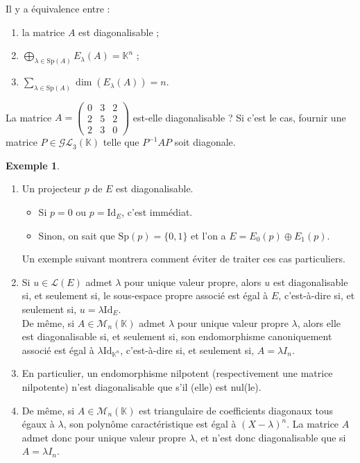 \documentclass[french]{article}
\newcommand{\K}{\mathbb{K}}
\newcommand{\inv}{^{-1}}
\newcommand{\Id}{\text{Id}}
\newcommand{\Sp}{\text{Sp}}
\theoremstyle{plain}
\theoremstyle{definition}
\newtheorem*{ex}{Exemple}
\theoremstyle{remark}
\begin{document}
	\begin{cor}%
		Il y a équivalence entre :
		\begin{enumerate}[label=(\roman*)]
			\item la matrice $A$ est diagonalisable ;
			\item $\displaystyle\bigoplus_{\lambda\in\Sp(A)}E_\lambda(A)=\K^n$ ;
			\item $\displaystyle\sum_{\lambda\in\Sp(A)}\dim(E_\lambda(A))=n$.
		\end{enumerate}
	\end{cor}
	
	\begin{exo}
		La matrice $A=\begin{pmatrix}
			0&3&2\\
			2&5&2\\
			2&3&0
		\end{pmatrix}$ est-elle diagonalisable ? Si c'est le cas, fournir une matrice $P\in\mathcal{GL}_3(\K)$ telle que $P\inv AP$ soit diagonale. 
	\end{exo}
	
	\begin{ex}
		\begin{enumerate}
			\item Un projecteur $p$ de $E$ est diagonalisable.
			\begin{itemize}
				\item Si $p=0$ ou $p=\Id_E$, c'est immédiat.
				\item Sinon, on sait que $\Sp(p)=\{0,1\}$ et l'on a $E=E_0(p)\oplus E_1(p)$.
			\end{itemize}
			Un exemple suivant montrera comment éviter de traiter ces cas particuliers.
			\item Si $u\in\mathcal{L}(E)$ admet $\lambda$ pour unique valeur propre, alors $u$ est diagonalisable si, et seulement si, le sous-espace propre associé est égal à $E$, c'est-à-dire si, et seulement si, $u=\lambda\Id_E$.\\
			De même, si $A\in\mathcal{M}_n(\K)$ admet $\lambda$ pour unique valeur propre $\lambda$, alors elle est diagonalisable si, et seulement si, son endomorphisme canoniquement associé est égal à $\lambda\Id_{\K^n}$, c'est-à-dire si, et seulement si, $A=\lambda I_n$.
			\item En particulier, un endomorphisme nilpotent (respectivement une matrice nilpotente) n'est diagonalisable que s'il (elle) est nul(le). %
			\item De même, si $A\in\mathcal{M}_n(\K)$ est triangulaire de coefficients diagonaux tous égaux à $\lambda$, son polynôme caractéristique est égal à $(X-\lambda)^n$. La matrice $A$ admet donc pour unique valeur propre $\lambda$, et n'est donc diagonalisable que si $A=\lambda I_n$.
		\end{enumerate}
	\end{ex}
	
\end{document}
